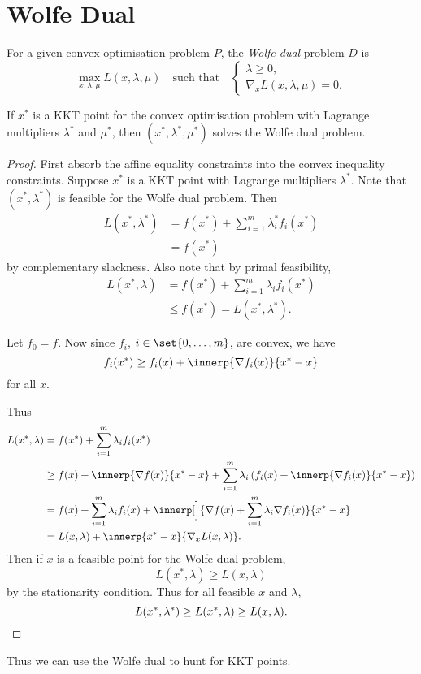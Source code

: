 \section{Wolfe Dual} \label{sec:wolfe_dual}
\begin{definition*} \label{def:wolfe_dual}
    For a given convex optimisation problem $P$, the \emph{Wolfe dual}
    problem $D$ is \[
        \max_{x, \lambda, \mu} L(x, \lambda, \mu) \quad \text{such that}
        \quad \begin{cases}
            \lambda \ge 0, \\
            \nabla_x L(x, \lambda, \mu) = 0.
        \end{cases}
    \]
\end{definition*}
\begin{theorem*}
    If $x^*$ is a KKT point for the convex optimisation problem with
    Lagrange multipliers $\lambda^*$ and $\mu^*$, then
    $(x^*, \lambda^*, \mu^*)$ solves the Wolfe dual problem.
\end{theorem*}
\begin{proof}
    First absorb the affine equality constraints into the convex
    inequality constraints.
    Suppose $x^*$ is a KKT point with Lagrange multipliers
    $\lambda^*$.
    Note that $(x^*, \lambda^*)$ is feasible for the Wolfe dual
    problem.
    Then \begin{align*}
        L(x^*, \lambda^*) &= f(x^*) + \sum_{i=1}^{m} \lambda_i^* f_i(x^*) \\
                    &= f(x^*)
    \end{align*} by complementary slackness.
    Also note that by primal feasibility, \begin{align*}
        L(x^*, \lambda) &= f(x^*) + \sum_{i=1}^{m} \lambda_i f_i(x^*) \\
                  &\le f(x^*) = L(x^*, \lambda^*).
    \end{align*}

    Let $f_0 = f$.
    Now since $f_i$, $i \in \set{0, \dots, m}$, are convex, we have \[
        f_i(x^*) \ge f_i(x) + \innerp{\nabla f_i(x)}{x^* - x}
    \] for all $x$.

    Thus \begin{align*}
        L(x^*, \lambda)
            &= f(x^*) + \sum_{i=1}^{m} \lambda_i f_i(x^*) \\
            &\ge f(x) + \innerp{\nabla f(x)}{x^* - x}
                + \sum_{i=1}^{m} \lambda_i \left(f_i(x)
                            + \innerp{\nabla f_i(x)}{x^* - x}\right) \\
            &= f(x) + \sum_{i=1}^{m} \lambda_i f_i(x)
                + \innerp[\Big]{\nabla f(x)
                    + \sum_{i=1}^{m} \lambda_i \nabla f_i(x)}{x^* - x} \\
            &= L(x, \lambda) + \innerp{x^* - x}{\nabla_x L(x, \lambda)}.
    \end{align*}
    Then if $x$ is a feasible point for the Wolfe dual problem, \[
        L(x^*, \lambda) \ge L(x, \lambda)
    \] by the stationarity condition.
    Thus for all feasible $x$ and $\lambda$, \[
        L(x^*, \lambda^*) \ge L(x^*, \lambda) \ge L(x, \lambda). \qedhere
    \]
\end{proof}
Thus we can use the Wolfe dual to hunt for KKT points.
